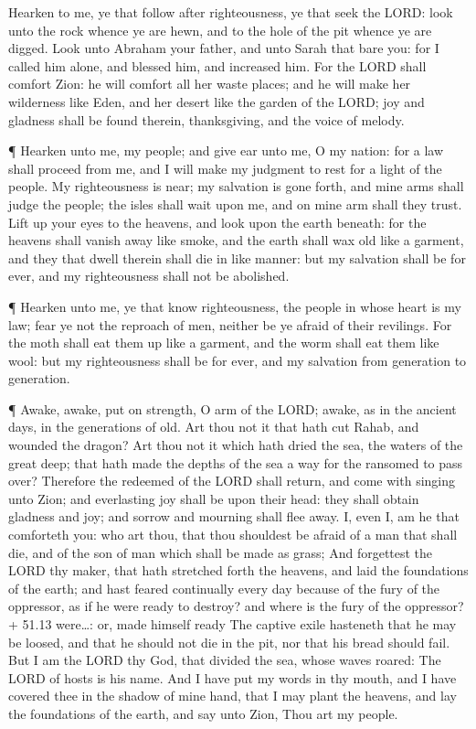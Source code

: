  Hearken to me, ye that follow after righteousness, ye that
seek the LORD: look unto the rock whence ye are hewn, and to the hole of
the pit whence ye are digged.  Look unto Abraham your
father, and unto Sarah that bare you: for I called him alone, and
blessed him, and increased him.  For the LORD shall comfort
Zion: he will comfort all her waste places; and he will make her
wilderness like Eden, and her desert like the garden of the LORD; joy
and gladness shall be found therein, thanksgiving, and the voice of
melody.

 ¶ Hearken unto me, my people; and give ear unto me, O my
nation: for a law shall proceed from me, and I will make my judgment to
rest for a light of the people.  My righteousness is near;
my salvation is gone forth, and mine arms shall judge the people; the
isles shall wait upon me, and on mine arm shall they trust. 
Lift up your eyes to the heavens, and look upon the earth beneath: for
the heavens shall vanish away like smoke, and the earth shall wax old
like a garment, and they that dwell therein shall die in like manner:
but my salvation shall be for ever, and my righteousness shall not be
abolished.

 ¶ Hearken unto me, ye that know righteousness, the people
in whose heart is my law; fear ye not the reproach of men, neither be ye
afraid of their revilings.  For the moth shall eat them up
like a garment, and the worm shall eat them like wool: but my
righteousness shall be for ever, and my salvation from generation to
generation.

 ¶ Awake, awake, put on strength, O arm of the LORD; awake,
as in the ancient days, in the generations of old. Art thou not it that
hath cut Rahab, and wounded the dragon?  Art thou not it
which hath dried the sea, the waters of the great deep; that hath made
the depths of the sea a way for the ransomed to pass over? 
Therefore the redeemed of the LORD shall return, and come with singing
unto Zion; and everlasting joy shall be upon their head: they shall
obtain gladness and joy; and sorrow and mourning shall flee away.
 I, even I, am he that comforteth you: who art thou, that
thou shouldest be afraid of a man that shall die, and of the son of man
which shall be made as grass;  And forgettest the LORD thy
maker, that hath stretched forth the heavens, and laid the foundations
of the earth; and hast feared continually every day because of the fury
of the oppressor, as if he were ready to destroy? and where is the fury
of the oppressor?+ 51.13 were\ldots: or, made himself ready
 The captive exile hasteneth that he may be loosed, and
that he should not die in the pit, nor that his bread should fail.
 But I am the LORD thy God, that divided the sea, whose
waves roared: The LORD of hosts is his name.  And I have
put my words in thy mouth, and I have covered thee in the shadow of mine
hand, that I may plant the heavens, and lay the foundations of the
earth, and say unto Zion, Thou art my people.

